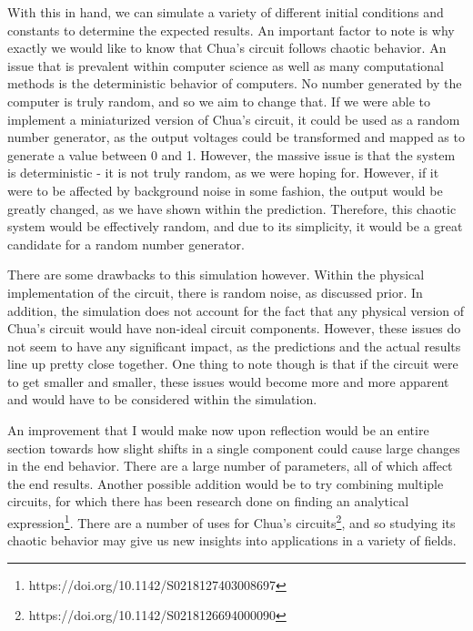 \documentclass{article}
\begin{document}
    With this in hand, we can simulate a variety of different initial conditions and constants to determine the expected results. An important factor to note is why exactly we would like to know that Chua's circuit follows chaotic behavior. 
    An issue that is prevalent within computer science as well as many computational methods is the deterministic behavior of computers. No number generated by the computer is truly random, and so we aim to change that. If we were able to implement a miniaturized version of Chua's circuit, it could be used as a random number generator, as the output voltages could be transformed and mapped as to generate a value between 0 and 1. However, the massive issue is that the system is deterministic - it is not truly random, as we were hoping for. However, if it were to be affected by background noise in some fashion, the output would be greatly changed, as we have shown within the prediction. Therefore, this chaotic system would be effectively random, and due to its simplicity, it would be a great candidate for a random number generator.
    
    There are some drawbacks to this simulation however. Within the physical implementation of the circuit, there is random noise, as discussed prior. In addition, the simulation does not account for the fact that any physical version of Chua's circuit would have non-ideal circuit components. However, these issues do not seem to have any significant impact, as the predictions and the actual results line up pretty close together. One thing to note though is that if the circuit were to get smaller and smaller, these issues would become more and more apparent and would have to be considered within the simulation. 
    
    An improvement that I would make now upon reflection would be an entire section towards how slight shifts in a single component could cause large changes in the end behavior. There are a large number of parameters, all of which affect the end results. Another possible addition would be to try combining multiple circuits, for which there has been research done on finding an analytical expression\footnote{https://doi.org/10.1142/S0218127403008697}. There are a number of uses for Chua's circuits\footnote{https://doi.org/10.1142/S0218126694000090}, and so studying its chaotic behavior may give us new insights into applications in a variety of fields.
\end{document}
